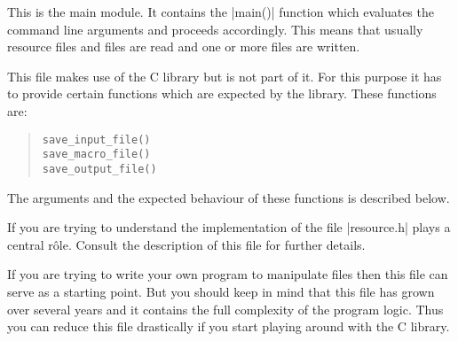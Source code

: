 

This is the \BibTool{} main module. It contains the |main()|
function which evaluates the command line arguments and
proceeds accordingly. This means that usually resource files
and \BibTeX{} files are read and one or more \BibTeX{} files
are written.

This file makes use of the \BibTool{} C library but is not
part of it. For this purpose it has to provide certain
functions which are expected by the library. These functions
are: 
\begin{quote}
\texttt{save\_input\_file()}\\
\texttt{save\_macro\_file()}\\
\texttt{save\_output\_file()}\\
\end{quote}
The arguments and the expected behaviour of these functions is
described below.

If you are trying to understand the implementation of
\BibTool{} the file |resource.h| plays a central
r\^ole. Consult the description of this file for further
details. 

If you are trying to write your own program to manipulate
\BibTeX{} files then this file can serve as a starting point.
But you should keep in mind that this file has grown over
several years and it contains the full complexity of the
\BibTool{} program logic. Thus you can reduce this file
drastically if you start playing around with the \BibTool{} C
library. 

